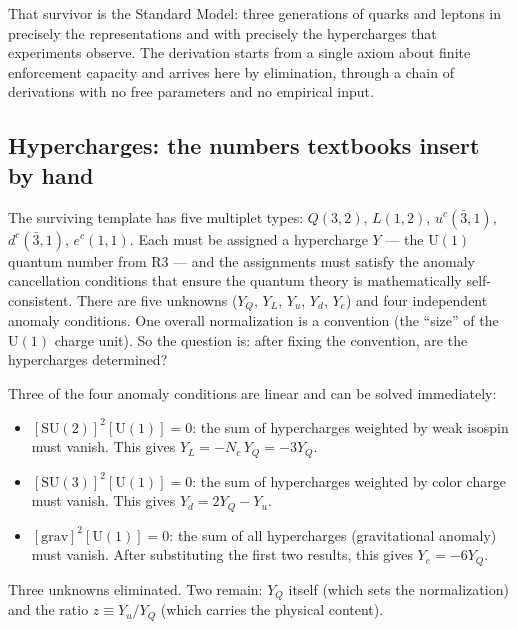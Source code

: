 \documentclass[11pt]{article}
\newenvironment{varlist}{\begin{itemize}[nosep,leftmargin=2em]}{\end{itemize}}
\newcommand{\SU}{\mathrm{SU}}
\newcommand{\U}{\mathrm{U}}
\begin{document}
That survivor is the Standard Model: three generations of quarks and leptons in precisely the representations and with precisely the hypercharges that experiments observe.  The derivation starts from a single axiom about finite enforcement capacity and arrives here by elimination, through a chain of derivations with no free parameters and no empirical input.

\subsection{Hypercharges: the numbers textbooks insert by hand}

The surviving template has five multiplet types: $Q(3,2)$, $L(1,2)$, $u^c(\bar{3},1)$, $d^c(\bar{3},1)$, $e^c(1,1)$.  Each must be assigned a hypercharge $Y$ --- the $\U(1)$ quantum number from R3 --- and the assignments must satisfy the anomaly cancellation conditions that ensure the quantum theory is mathematically self-consistent.  There are five unknowns ($Y_Q$, $Y_L$, $Y_u$, $Y_d$, $Y_e$) and four independent anomaly conditions.  One overall normalization is a convention (the ``size'' of the $\U(1)$ charge unit).  So the question is: after fixing the convention, are the hypercharges determined?

Three of the four anomaly conditions are linear and can be solved immediately:

\begin{varlist}
\item $[\SU(2)]^2[\U(1)] = 0$: the sum of hypercharges weighted by weak isospin must vanish.  This gives $Y_L = -N_c \, Y_Q = -3 Y_Q$.
\item $[\SU(3)]^2[\U(1)] = 0$: the sum of hypercharges weighted by color charge must vanish.  This gives $Y_d = 2Y_Q - Y_u$.
\item $[\mathrm{grav}]^2[\U(1)] = 0$: the sum of all hypercharges (gravitational anomaly) must vanish.  After substituting the first two results, this gives $Y_e = -6 Y_Q$.
\end{varlist}

\noindent Three unknowns eliminated.  Two remain: $Y_Q$ itself (which sets the normalization) and the ratio $z \equiv Y_u / Y_Q$ (which carries the physical content).
\end{document}
